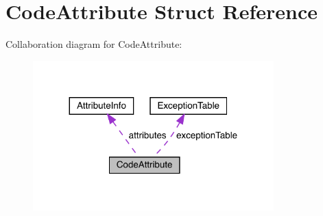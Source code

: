 \hypertarget{structCodeAttribute}{}\section{Code\+Attribute Struct Reference}
\label{structCodeAttribute}


Collaboration diagram for Code\+Attribute\+:
\nopagebreak
\begin{figure}[H]
\begin{center}
\leavevmode
\includegraphics[width=263pt]{structCodeAttribute__coll__graph}
\end{center}
\end{figure}
